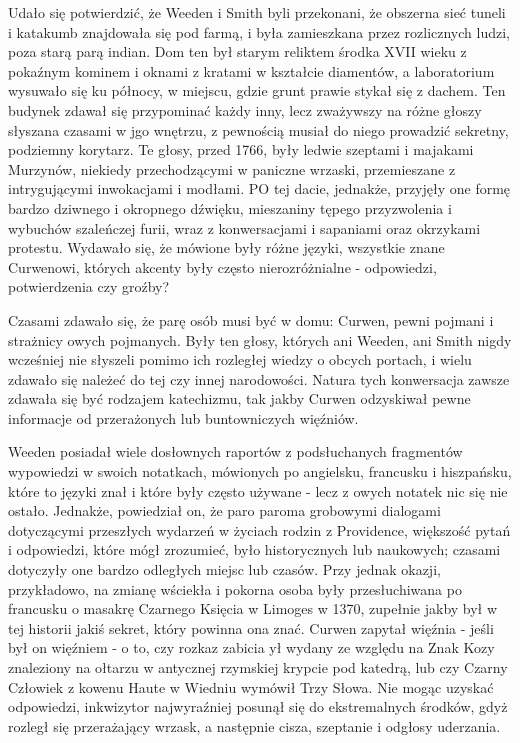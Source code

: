 Udało się potwierdzić, że Weeden i Smith byli przekonani, że obszerna sieć tuneli i katakumb znajdowała się pod farmą, i była zamieszkana przez rozlicznych ludzi, poza starą parą indian. Dom ten był starym reliktem środka XVII wieku z pokaźnym kominem i oknami z kratami w kształcie diamentów, a laboratorium wysuwało się ku północy, w miejscu, gdzie grunt prawie stykał się z dachem. Ten budynek zdawał się przypominać każdy inny, lecz zważywszy na różne głoszy słyszana czasami w jgo wnętrzu, z pewnością musiał do niego prowadzić sekretny, podziemny korytarz. Te głosy, przed 1766, były ledwie szeptami i majakami Murzynów, niekiedy przechodzącymi w paniczne wrzaski, przemieszane z intrygującymi inwokacjami i modłami. PO tej dacie, jednakże, przyjęły one formę bardzo dziwnego i okropnego dźwięku, mieszaniny tępego przyzwolenia i wybuchów szaleńczej furii, wraz z konwersacjami i sapaniami oraz okrzykami protestu. Wydawało się, że mówione były różne języki, wszystkie znane Curwenowi, których akcenty były często nierozróżnialne - odpowiedzi, potwierdzenia czy groźby?

Czasami zdawało się, że parę osób musi być w domu: Curwen, pewni pojmani i strażnicy owych pojmanych. Były ten głosy, których ani Weeden, ani Smith nigdy wcześniej nie słyszeli pomimo ich rozległej wiedzy o obcych portach, i wielu zdawało się należeć do tej czy innej narodowości. Natura tych konwersacja zawsze zdawała się być rodzajem katechizmu, tak jakby Curwen odzyskiwał pewne informacje od przerażonych lub buntowniczych więźniów. 

Weeden posiadał wiele dosłownych raportów z podsłuchanych fragmentów wypowiedzi w swoich notatkach, mówionych po angielsku, francusku i hiszpańsku, które to języki znał i które były często używane - lecz z owych notatek nic się nie ostało. Jednakże, powiedział on, że paro paroma grobowymi dialogami dotyczącymi przeszłych wydarzeń w życiach rodzin z Providence, większość pytań i odpowiedzi, które mógł zrozumieć, było historycznych lub naukowych; czasami dotyczyły one bardzo odległych miejsc lub czasów. Przy jednak okazji, przykładowo, na zmianę wściekła i pokorna osoba były przesłuchiwana po francusku o masakrę Czarnego Księcia w Limoges w 1370, zupełnie jakby był w tej historii jakiś sekret, który powinna ona znać. Curwen zapytał więźnia - jeśli był on więźniem - o to, czy rozkaz zabicia ył wydany ze względu na Znak Kozy znaleziony na ołtarzu w antycznej rzymskiej krypcie pod katedrą, lub czy Czarny Człowiek z kowenu Haute w Wiedniu wymówił Trzy Słowa. Nie mogąc uzyskać odpowiedzi, inkwizytor najwyraźniej posunął się do ekstremalnych środków, gdyż rozległ się przerażający wrzask, a następnie cisza, szeptanie i odgłosy uderzania.

